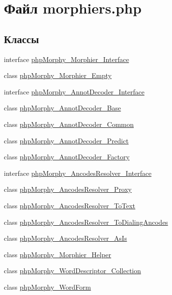\hypertarget{morphiers_8php}{
\section{Файл morphiers.php}
\label{morphiers_8php}
}
\subsection*{Классы}
\begin{DoxyCompactItemize}
\item 
interface \hyperlink{interfacephpMorphy__Morphier__Interface}{phpMorphy\_\-Morphier\_\-Interface}
\item 
class \hyperlink{classphpMorphy__Morphier__Empty}{phpMorphy\_\-Morphier\_\-Empty}
\item 
interface \hyperlink{interfacephpMorphy__AnnotDecoder__Interface}{phpMorphy\_\-AnnotDecoder\_\-Interface}
\item 
class \hyperlink{classphpMorphy__AnnotDecoder__Base}{phpMorphy\_\-AnnotDecoder\_\-Base}
\item 
class \hyperlink{classphpMorphy__AnnotDecoder__Common}{phpMorphy\_\-AnnotDecoder\_\-Common}
\item 
class \hyperlink{classphpMorphy__AnnotDecoder__Predict}{phpMorphy\_\-AnnotDecoder\_\-Predict}
\item 
class \hyperlink{classphpMorphy__AnnotDecoder__Factory}{phpMorphy\_\-AnnotDecoder\_\-Factory}
\item 
interface \hyperlink{interfacephpMorphy__AncodesResolver__Interface}{phpMorphy\_\-AncodesResolver\_\-Interface}
\item 
class \hyperlink{classphpMorphy__AncodesResolver__Proxy}{phpMorphy\_\-AncodesResolver\_\-Proxy}
\item 
class \hyperlink{classphpMorphy__AncodesResolver__ToText}{phpMorphy\_\-AncodesResolver\_\-ToText}
\item 
class \hyperlink{classphpMorphy__AncodesResolver__ToDialingAncodes}{phpMorphy\_\-AncodesResolver\_\-ToDialingAncodes}
\item 
class \hyperlink{classphpMorphy__AncodesResolver__AsIs}{phpMorphy\_\-AncodesResolver\_\-AsIs}
\item 
class \hyperlink{classphpMorphy__Morphier__Helper}{phpMorphy\_\-Morphier\_\-Helper}
\item 
class \hyperlink{classphpMorphy__WordDescriptor__Collection}{phpMorphy\_\-WordDescriptor\_\-Collection}
\item 
class \hyperlink{classphpMorphy__WordForm}{phpMorphy\_\-WordForm}

\end{DoxyCompactItemize}
